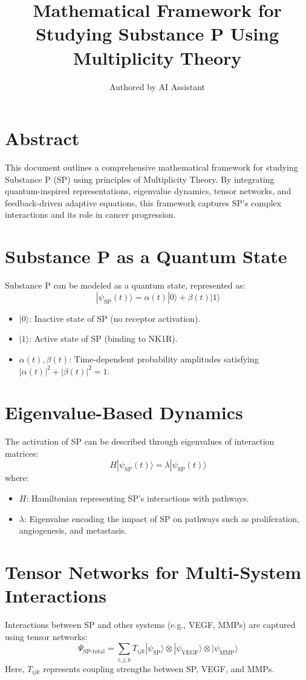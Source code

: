 \documentclass{article}
\title{Mathematical Framework for Studying Substance P Using Multiplicity Theory}
\author{Authored by AI Assistant}
\date{}
\begin{document}
\maketitle

\section*{Abstract}
This document outlines a comprehensive mathematical framework for studying Substance P (SP) using principles of Multiplicity Theory. By integrating quantum-inspired representations, eigenvalue dynamics, tensor networks, and feedback-driven adaptive equations, this framework captures SP's complex interactions and its role in cancer progression.

\section{Substance P as a Quantum State}
Substance P can be modeled as a quantum state, represented as:
\[\
|\psi_{\text{SP}}(t)\rangle = \alpha(t) |0\rangle + \beta(t) |1\rangle
\]
\begin{itemize}
    \item $|0\rangle$: Inactive state of SP (no receptor activation).
    \item $|1\rangle$: Active state of SP (binding to NK1R).
    \item $\alpha(t), \beta(t)$: Time-dependent probability amplitudes satisfying $|\alpha(t)|^2 + |\beta(t)|^2 = 1$.
\end{itemize}

\section{Eigenvalue-Based Dynamics}
The activation of SP can be described through eigenvalues of interaction matrices:
\[\
H |\psi_{\text{SP}}(t)\rangle = \lambda |\psi_{\text{SP}}(t)\rangle
\]
where:
\begin{itemize}
    \item $H$: Hamiltonian representing SP's interactions with pathways.
    \item $\lambda$: Eigenvalue encoding the impact of SP on pathways such as proliferation, angiogenesis, and metastasis.
\end{itemize}

\section{Tensor Networks for Multi-System Interactions}
Interactions between SP and other systems (e.g., VEGF, MMPs) are captured using tensor networks:
\[\
\Psi_{\text{SP-total}} = \sum_{i,j,k} T_{ijk} |\psi_{\text{SP}}\rangle \otimes |\psi_{\text{VEGF}}\rangle \otimes |\psi_{\text{MMP}}\rangle
\]
Here, $T_{ijk}$ represents coupling strengths between SP, VEGF, and MMPs.
\end{document}
